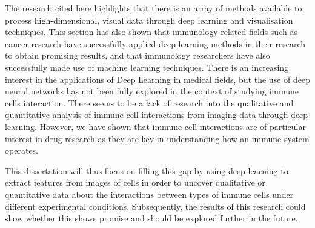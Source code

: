 The research cited here highlights that there is an array of methods available to process high-dimensional, visual data through deep learning and visualisation techniques. This section has also shown that immunology-related fields such as cancer research have successfully applied deep learning methods in their research to obtain promising results, and that immunology researchers have also successfully made use of machine learning techniques. There is an increasing interest in the applications of Deep Learning in medical fields, but the use of deep neural networks has not been fully explored in the context of studying immune cells interaction. There seems to be a lack of research into the qualitative and quantitative analysis of immune cell interactions from imaging data through deep learning. However, we have shown that immune cell interactions are of particular interest in drug research as they are key in understanding how an immune system operates. %

This dissertation will thus focus on filling this gap by using deep learning to extract features from images of cells in order to uncover qualitative or quantitative data about the interactions between types of immune cells under different experimental conditions. Subsequently, the results of this research could show whether this shows promise and should be explored further in the future.
